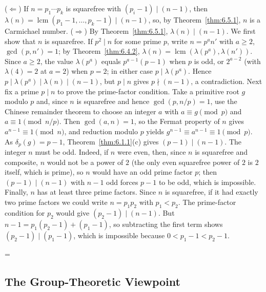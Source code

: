 \documentclass[11pt]{article}
\makeatletter
\theoremstyle{ntstyle}
\let\nt@closedisplay\]
\def\nt@guardedclose{\@ifnextchar\par{\nt@closeafterpar}{\@ifnextchar\end{\postdisplaypenalty\@M\nt@closedisplay}{\nt@closedisplay}}}
\def\nt@closeafterpar\par{\@ifnextchar\par{\nt@closeafterpar}{\@ifnextchar\end{\postdisplaypenalty\@M\nt@closedisplay\par}{\nt@closedisplay\par}}}
\renewenvironment{proof}[1][\proofname]{\par
  \pushQED{\qed}\normalfont\topsep\medskipamount\edef\nt@afterproof{\@endparpenalty=\the\@endparpenalty\relax}\@beginparpenalty\@M\@endparpenalty\@M\let\]\nt@guardedclose\trivlist\item[]\textit{#1\@addpunct{.}} \ignorespaces}{\ifvmode\addpenalty\@M\fi\popQED\nt@afterproof\endtrivlist\@endpefalse}
\DeclareMathOperator{\lcm}{lcm}
\makeatother
\begin{document}
\begin{proof} ($\Leftarrow$) If $n = p_1 \cdots p_k$ is
	squarefree with $(p_i-1) \mid (n-1)$, then $\lambda(n) =
		\lcm(p_1-1, \ldots, p_k-1) \mid (n-1)$, so, by Theorem~\ref{thm:6.5.1}, $n$ is a Carmichael number. ($\Rightarrow$) By Theorem~\ref{thm:6.5.1},
	$\lambda(n) \mid (n-1)$. We first show that $n$ is squarefree. If $p^{2} \mid n$ for
	some prime $p$, write $n = p^{a} n'$ with $a \ge 2$, $\gcd(p, n') =
		1$; by Theorem~\ref{thm:6.4.2}, $\lambda(n) =
		\lcm(\lambda(p^{a}), \lambda(n'))$. Since $a \ge 2$,
	the value $\lambda(p^{a})$ equals $p^{a-1}(p-1)$ when $p$ is odd, or $2^{a-2}$
	(with $\lambda(4)=2$ at $a=2$) when $p=2$; in either case $p \mid
		\lambda(p^{a})$. Hence $p \mid \lambda(p^{a}) \mid \lambda(n) \mid
		(n-1)$, but $p \mid n$ gives $p \nmid (n-1)$, a contradiction.
	Next fix a prime $p \mid n$ to prove the prime-factor condition. Take a primitive root $g$ modulo $p$ and, since $n$ is
	squarefree and hence $\gcd(p, n/p) = 1$, use the Chinese remainder
	theorem to choose an integer $a$ with $a \equiv g \pmod{p}$ and $a
		\equiv 1 \pmod{n/p}$. Then $\gcd(a, n) = 1$, so the Fermat property of
	$n$ gives $a^{n-1} \equiv 1 \pmod{n}$, and reduction modulo $p$ yields
	$g^{n-1} \equiv a^{n-1} \equiv 1 \pmod{p}$. As $\delta_p(g) = p-1$,
	Theorem~\ref{thm:6.1.1}(c) gives $(p-1) \mid (n-1)$. The integer $n$ must be odd. Indeed, if $n$ were even, then, since $n$ is squarefree
	and composite, $n$ would not be a power of $2$ (the only even squarefree
	power of $2$ is $2$ itself, which is prime), so $n$ would have an odd prime
	factor $p$; then $(p-1) \mid (n-1)$ with $n-1$ odd forces $p-1$
	to be odd, which is impossible. Finally, $n$ has at least three prime factors. Since $n$ is squarefree, if it had
	exactly two prime factors we could write $n=p_1p_2$ with $p_1<p_2$.
	The prime-factor condition for $p_2$ would give
	$(p_2-1)\mid(n-1)$. But
	$n-1=p_1(p_2-1)+(p_1-1)$, so subtracting the first term shows
	$(p_2-1)\mid(p_1-1)$, which is impossible because
	$0<p_1-1<p_2-1$.

\end{proof}
\subsection{The Group-Theoretic Viewpoint}\label{subsec:6.6}
\end{document}
